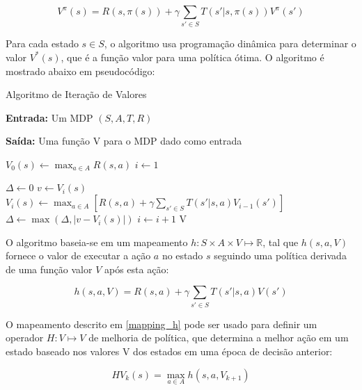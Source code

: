 \documentclass[cic,tc]{iiufrgs}
\begin{document}
\begin{equation} \label{value_function}
  V^\pi(s) = R(s, \pi(s)) + \gamma\sum_{s' \in S}T(s'|s, \pi(s))V^\pi(s')
\end{equation}

Para cada estado $s \in S$, o algoritmo usa programação dinâmica para determinar
o valor $V^*(s)$, que é a função valor para uma política ótima. O algoritmo é
mostrado abaixo em pseudocódigo:



\begin{algorithm}
\label{value_iteration_alg}
\caption{Algoritmo de Iteração de Valores}

\textbf{Entrada:}  Um MDP $(S, A, T, R)$


\textbf{Saída:} Uma função V para o MDP dado como entrada


\begin{algorithmic}[1]
    \State $V_0(s) \gets \max_{a \in A}R(s, a)$
  \EndFor
  \State $i \gets 1$

  \Repeat
    \State $\Delta \gets 0$
      \State $v \gets V_i(s)$
      \State $V_i(s) \gets \max_{a \in A}[R(s, a) + \gamma\sum_{s' \in S}
       T(s' | s, a)V_{i-1}(s')]$
       \State $\Delta \gets \max(\Delta, |v - V_i(s)|)$
    \EndFor
    \State $i \gets i + 1$
  \Until {$ \Delta < \epsilon $}
  \State \Return V
\EndFunction
\end{algorithmic}
\end{algorithm}

O algoritmo baseia-se em um mapeamento $h: S \times A \times V \mapsto
\mathbb{R}$, tal que $h(s, a, V)$ fornece o valor de executar a ação $a$ no
estado $s$ seguindo uma política derivada de uma função valor $V$ após esta
ação:

\begin{equation}
\label{mapping_h}
h(s, a, V) = R(s, a) + \gamma\sum_{s' \in S}T(s' | s, a)V(s')
\end{equation}

O mapeamento descrito em \ref{mapping_h} pode ser usado para definir um operador
 $H: V \mapsto V$ de melhoria de política, que determina a melhor ação em um
 estado baseado nos valores V dos estados em uma época de decisão anterior:

\begin{equation}\label{melhoria_politica}
  HV_k(s) = \max_{a \in A}h(s, a, V_{k+1})
\end{equation}
\end{document}
